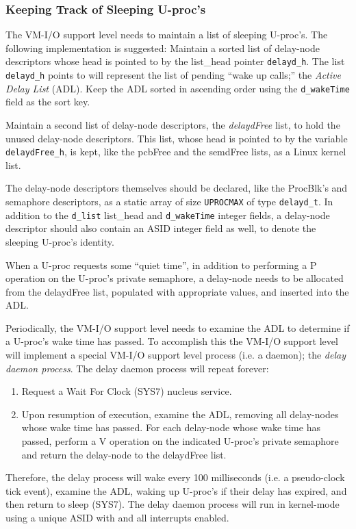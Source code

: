 \subsubsection{Keeping Track of Sleeping U-proc's}
The VM-I/O support level needs to maintain a list of sleeping U-proc's. 
The following implementation is suggested: Maintain a sorted list of delay-node descriptors whose head is pointed to by the list\_head pointer \verb+delayd_h+. The list \verb+delayd_h+ points to will represent the list of pending ``wake up calls;'' the \emph{Active Delay List} (ADL). 
Keep the ADL sorted in ascending order using the \verb+d_wakeTime+ field as the sort key.

Maintain a second list of delay-node descriptors, the \emph{delaydFree} list, to hold the unused delay-node descriptors. 
This list, whose head is pointed to by the variable \verb+delaydFree_h+, is kept, like the pcbFree and the semdFree lists, as a Linux kernel list.

The delay-node descriptors themselves should be declared, like the ProcBlk's and semaphore descriptors, as a static array of size \verb+UPROCMAX+ of type \verb+delayd_t+.
In addition to the \verb+d_list+ list\_head and \verb+d_wakeTime+ integer fields, a delay-node descriptor should also contain an ASID integer field as well, to denote the sleeping U-proc's identity.

When a U-proc requests some ``quiet time'', in addition to performing a P operation on the U-proc's private semaphore, a delay-node needs to be allocated from the delaydFree list, populated with appropriate values, and inserted into the ADL.

Periodically, the VM-I/O support level needs to examine the ADL to determine if a U-proc's wake time has passed.
To accomplish this the VM-I/O support level will implement a special VM-I/O support level process (i.e. a daemon); the \emph{delay daemon process}. 
The delay daemon process will repeat forever:
\begin{enumerate}
\item Request a Wait For Clock (SYS7) nucleus service.
\item Upon resumption of execution, examine the ADL, removing all delay-nodes whose wake time has passed. 
For each delay-node whose wake time has passed, perform a V operation on the indicated U-proc's private semaphore and return the delay-node to the delaydFree list.
\end{enumerate}
Therefore, the delay process will wake every 100 milliseconds (i.e. a pseudo-clock tick event), examine the ADL, waking up U-proc's if their delay has expired, and then return to sleep (SYS7). The delay daemon process will run in kernel-mode using a unique ASID with \vmon{} and all interrupts enabled.




